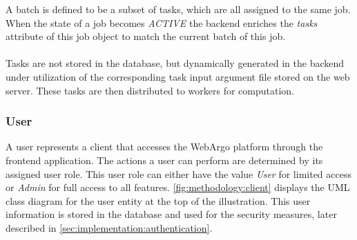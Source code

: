 A batch is defined to be a subset of tasks, which are all assigned to the same job. When the state of a job becomes \emph{ACTIVE} the backend enriches the \emph{tasks} attribute of this job object to match the current batch of this job.
\\~\\
Tasks are not stored in the database, but dynamically generated in the backend under utilization of the corresponding task input argument file stored on the web server. These tasks are then distributed to workers for computation.

\subsubsection{User}
A user represents a client that accesses the WebArgo platform through the frontend application. The actions a user can perform are determined by its assigned user role. This user role can either have the value \emph{User} for limited access or \emph{Admin} for full access to all features. \autoref{fig:methodology:client} displays the \ac{UML} class diagram for the user entity at the top of the illustration. This user information is stored in the database and used for the security measures, later described in \autoref{sec:implementation:authentication}. 

